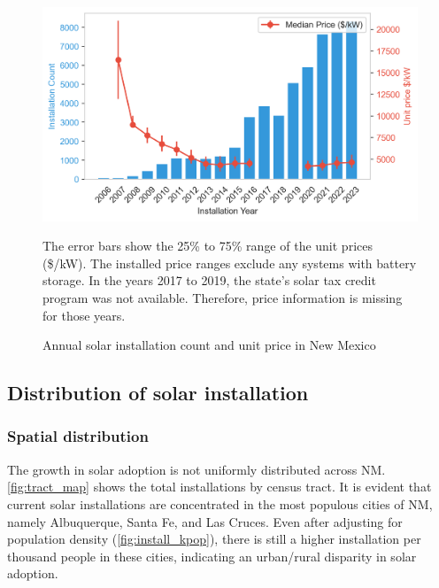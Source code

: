 \documentclass[12pt,twoside,letterpaper]{article}
\begin{document}
\begin{figure}[H]
    \centering
\includegraphics[width=1\textwidth]{figures/installation_count_price.png}
    \caption{Annual solar installation count and unit price in New Mexico}
    \label{fig:installation_count}
    \begin{flushleft}
        \footnotesize The error bars show the 25\% to 75\% range of the unit prices (\$/kW). The installed price ranges exclude any systems with battery storage. In the years 2017 to 2019, the state’s solar tax credit program was not available. Therefore, price information is missing for those years.
    \end{flushleft}
\end{figure}

\subsection{Distribution of solar installation}

\subsubsection{Spatial distribution}
\label{subsec:Spatial distribution}

The growth in solar adoption is not uniformly distributed across NM. \autoref{fig:tract_map} shows the total installations by census tract. It is evident that current solar installations are concentrated in the most populous cities of NM, namely Albuquerque, Santa Fe, and Las Cruces. Even after adjusting for population density (\autoref{fig:install_kpop}), there is still a higher installation per thousand people in these cities, indicating an urban/rural disparity in solar adoption.
\end{document}

